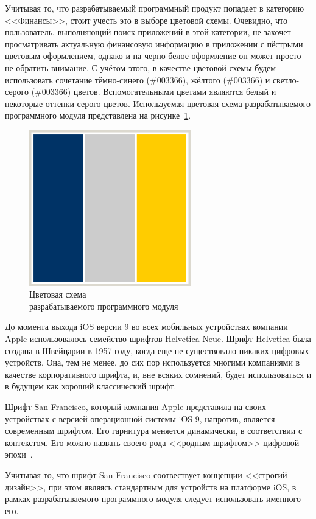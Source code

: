Учитывая то, что разрабатываемый программный продукт попадает в категорию <<Финансы>>,
стоит учесть это в выборе цветовой схемы. Очевидно, что пользователь,
выполняющий поиск приложений в этой категории, не захочет просматривать
актуальную финансовую информацию в приложении с пёстрыми цветовым оформлением,
однако и на черно-белое оформление он может просто не обратить внимание.
С учётом этого, в качестве цветовой схемы будем использовать сочетание
тёмно-синего (\#003366), жёлтого (\#003366) и светло-серого (\#003366) цветов.
Вспомогательными цветами являются белый и некоторые оттенки серого цветов.
Используемая цветовая схема разрабатываемого программного модуля
представлена на рисунке~\ref{fig:colors}.
\begin{figure}[h!]
  \centering
  \includegraphics[width=70mm]{fig/colors}
  \caption{Цветовая схема \\ разрабатываемого программного модуля}
  \label{fig:colors}
\end{figure}

До момента выхода iOS версии 9 во всех мобильных устройствах компании Apple
использовалось семейство шрифтов Helvetica Neue. Шрифт Helvetica была
создана в Швейцарии в 1957 году, когда еще не существовало никаких цифровых
устройств. Она, тем не менее, до сих пор используется многими компаниями
в качестве корпоративного шрифта, и, вне всяких сомнений, будет использоваться
и в будущем как хороший классический шрифт.

Шрифт San Francisco, который компания Apple представила на своих устройствах
с версией операционной системы iOS 9, напротив, является современным шрифтом.
Его гарнитура меняется динамически, в соответствии с контекстом.
Его можно назвать своего рода <<родным шрифтом>>
цифровой эпохи~\cite{san_francisco_font}.

Учитывая то, что шрифт San Francisco соотвествует концепции <<строгий дизайн>>,
при этом являясь стандартным для устройств на платформе iOS,
в рамках разрабатываемого программного модуля следует использовать именного его.
